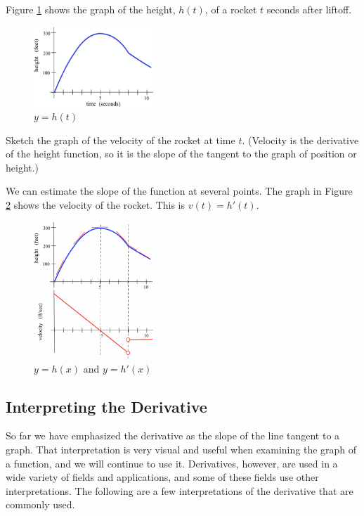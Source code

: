 \begin{example}
Figure \ref{fig:2-3-ht} shows the graph of the height, $h(t)$, of a rocket $t$ seconds after liftoff.

\begin{figure}[!ht]
  \centering
    \includegraphics[width=0.4\textwidth]{img/chap2/image025.png}
    \caption{$y=h(t)$}
    \label{fig:2-3-ht}
\end{figure}
Sketch the graph of the velocity of the rocket at time $t$. (Velocity is the derivative of the height function, so it is the slope of the tangent to the graph of position or height.)

\begin{solution} We can estimate the slope of the function at several points. The graph in Figure \ref{fig:2-3-hprime} shows the velocity of the rocket. This is $v(t)=h'(t)$.

\begin{figure}[!ht]
  \centering
    \includegraphics[width=0.4\textwidth]{img/chap2/image026.png}
    \caption{$y=h(x)$ and $y=h'(x)$}
    \label{fig:2-3-hprime}
\end{figure}
\end{solution}
\end{example}

\subsection{Interpreting the Derivative}
So far we have emphasized the derivative as the slope of the line tangent to a graph. That interpretation is very visual and useful when examining the graph of a function, and we will continue to use it. Derivatives, however, are used in a wide variety of fields and applications, and some of these fields use other interpretations. The following are a few interpretations of the derivative that are commonly used.


